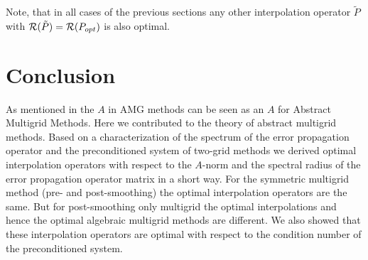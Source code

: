 \documentclass[final]{siamltex}
\numberwithin{equation}{section}
\newcommand{\ran} {{\cal R}}
\begin{document}
Note, that  in all cases of the previous sections any other interpolation operator $\tilde P$  with  $\ran (\tilde P) = \ran (P_{opt})$ is also optimal. 

\section{Conclusion}
As mentioned in \cite{XuZ17} the  $A$ in AMG methods can be seen as an $A$ for 
Abstract 
Multigrid Methods. Here  we contributed to the  theory of  
abstract multigrid methods. Based on a characterization of the spectrum of the  error propagation operator and the preconditioned system of two-grid methods  we derived optimal interpolation operators with respect  to the $A$-norm and the spectral radius of the  error propagation operator matrix in a 
short way. For the symmetric multigrid method (pre- and  post-smoothing) the optimal interpolation operators are  the same. But for post-smoothing only multigrid the optimal interpolations and hence the optimal algebraic multigrid methods are different. We also showed that these interpolation operators 
are optimal  with respect to the condition number of the preconditioned system.







%

\end{document}
